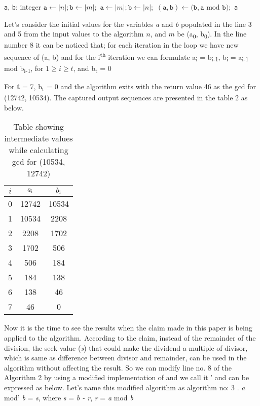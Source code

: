 \documentclass[conference,compsoc]{IEEEtran}
\newcommand{\var}[1]{\textit{#1}}
\newcommand{\progvar}[1]{\texttt{#1}}
\renewcommand{\mod}{\text{mod}}
\begin{document}

\begin{algorithmic}[1]
\STATE \progvar{a}, \progvar{b}: integer
	\STATE $\progvar{a} \gets |n|; \progvar{b} \gets |m|;$
\ELSE
	\STATE $\progvar{a} \gets |m|; \progvar{b} \gets |n|;$
\ENDIF
\WHILE{$\progvar{b} > 0$ } 
	\STATE $(\progvar{a}, \progvar{b}) \leftarrow (\progvar{b}, \progvar{a}  $ $\mod $ $\progvar{b});$
\ENDWHILE
\RETURN \progvar{a}
\end {algorithmic}

Let's consider the initial values for the variables \var{a} and \var{b} populated in the line 3 and 5 from the input values to the algorithm $n$, and $m$ be (a\textsubscript{0}, b\textsubscript{0}). In the line number 8 it can be noticed that; for each iteration in the loop we have new sequence of (a, b) and for the i\textsuperscript{th} iteration we can formulate a\textsubscript{i} = b\textsubscript{i-1}, b\textsubscript{i} = a\textsubscript{i-1} mod b\textsubscript{i-1}, for $1 \geq i \geq t$, and b\textsubscript{t} = 0

For \textbf{t} = 7, b\textsubscript{t} = 0 and the algorithm exits with the return value 
46 as the gcd for (12742, 10534). The captured output sequences are presented in the table 2 as below.
\begin{table}[!htbp]
\caption{Table showing intermediate values while calculating gcd for (10534, 12742)}
\label{table_org_book_example}
\centering
	\begin{tabular}{c | c | c}
		\hline
		$i$ & $a\textsubscript{i}$ & $b\textsubscript{i}$ \\ [0.5ex] 
		\hline
		0 & 12742 & 10534 \\ 
		1 & 10534 & 2208 \\  
		2 & 2208  & 1702 \\
		3 & 1702  & 506 \\
		4 & 506   & 184 \\
		5 & 184   & 138 \\
		6 & 138   & 46 \\
		7 & 46    & 0
	\end{tabular}
\end{table}

Now it is the time to see the results when the claim made in this paper is being applied 
to the algorithm. According to the claim, instead of the remainder of the division, the seek value (\var{s}) that could make the dividend a multiple of divisor, which is same as difference between divisor and remainder, can be used in the algorithm without affecting the result. So we can modify line no. 8 of the Algorithm 2 by using a modified implementation of \mod and we call it \mod' and can be expressed as below. Let's name this modified algorithm as algorithm no: 3 .  \linebreak
\textit{a} mod' \textit{b} = \textit{s}, where  \textit{s} = \textit{b - r}, \textit{r} = \textit{a} mod \textit{b}
\end{document}
